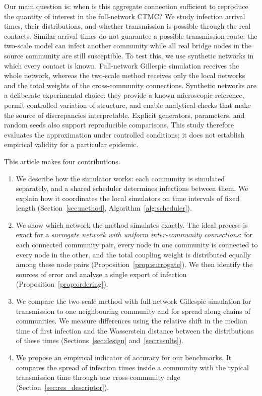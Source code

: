 \documentclass{ieeeaccess}
\newcommand{\michael}[2]{{\color{RoyalBlue}#1}}
\begin{document}
Our main question is: when is this aggregate connection sufficient to reproduce the quantity of interest in the full-network CTMC? We study infection arrival times, their distributions, and whether transmission is possible through the real contacts. Similar arrival times do not guarantee a possible transmission route: the two-scale model can infect another community while all real bridge nodes in the source community are still susceptible. To test this, we use synthetic networks in which every contact is known. \michael{Full-network Gillespie simulation receives the whole network, whereas the two-scale method receives only the local networks and the total weights of the cross-community connections. Synthetic networks are a deliberate experimental choice: they provide a known microscopic reference, permit controlled variation of structure, and enable analytical checks that make the source of discrepancies interpretable. Explicit generators, parameters, and random seeds also support reproducible comparisons. This study therefore evaluates the approximation under controlled conditions; it does not establish empirical validity for a particular epidemic.}{Full-network Gillespie simulation receives the whole network, whereas the two-scale method receives only the local networks and the total weights of the cross-community connections.}

This article makes four contributions.
\begin{enumerate}
\item We describe how the simulator works: each community is simulated separately, and a shared scheduler determines infections between them. We explain how it coordinates the local simulators on time intervals of fixed length (Section~\ref{sec:method}, Algorithm~\ref{alg:scheduler}).
\item We show which network the method simulates exactly. The ideal process is exact for a \emph{surrogate network with uniform inter-community connections}: for each connected community pair, every node in one community is connected to every node in the other, and the total coupling weight is distributed equally among these node pairs (Proposition~\ref{prop:surrogate}). We then identify the sources of error and analyse a single export of infection (Proposition~\ref{prop:ordering}).
\item We compare the two-scale method with full-network Gillespie simulation for transmission to one neighbouring community and for spread along chains of communities. We measure differences using the relative shift in the median time of first infection and the Wasserstein distance between the distributions of these times (Sections~\ref{sec:design} and~\ref{sec:results}).
\item We propose an empirical indicator of accuracy for our benchmarks. It compares the spread of infection times inside a community with the typical transmission time through one cross-community edge (Section~\ref{sec:res_descriptor}).
\end{enumerate}
\end{document}
